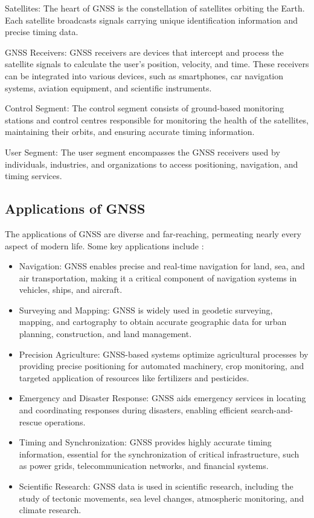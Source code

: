 Satellites: The heart of GNSS is the constellation of satellites orbiting the Earth. Each satellite broadcasts signals carrying unique identification information and precise timing data.

GNSS Receivers: GNSS receivers are devices that intercept and process the satellite signals to calculate the user's position, velocity, and time. These receivers can be integrated into various devices, such as smartphones, car navigation systems, aviation equipment, and scientific instruments.

Control Segment: The control segment consists of ground-based monitoring stations and control centres responsible for monitoring the health of the satellites, maintaining their orbits, and ensuring accurate timing information.

User Segment: The user segment encompasses the GNSS receivers used by individuals, industries, and organizations to access positioning, navigation, and timing services.

\subsection{Applications of GNSS}

The applications of GNSS are diverse and far-reaching, permeating nearly every aspect of modern life. Some key applications include \cite{RN177}:
\begin{itemize}
    \item Navigation: GNSS enables precise and real-time navigation for land, sea, and air transportation, making it a critical component of navigation systems in vehicles, ships, and aircraft.
    \item Surveying and Mapping: GNSS is widely used in geodetic surveying, mapping, and cartography to obtain accurate geographic data for urban planning, construction, and land management.
    \item Precision Agriculture: GNSS-based systems optimize agricultural processes by providing precise positioning for automated machinery, crop monitoring, and targeted application of resources like fertilizers and pesticides.
    \item Emergency and Disaster Response: GNSS aids emergency services in locating and coordinating responses during disasters, enabling efficient search-and-rescue operations.
    \item Timing and Synchronization: GNSS provides highly accurate timing information, essential for the synchronization of critical infrastructure, such as power grids, telecommunication networks, and financial systems.
    \item Scientific Research: GNSS data is used in scientific research, including the study of tectonic movements, sea level changes, atmospheric monitoring, and climate research.
\end{itemize}

